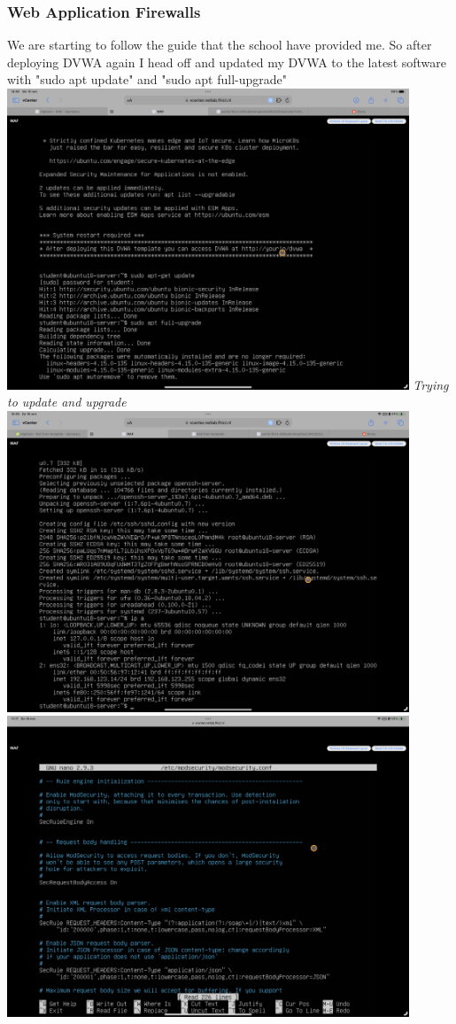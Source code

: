 \documentclass[12pt, letterpaper]{article}
\begin{document}
\subsubsection{Web Application Firewalls}
We are starting to follow the guide that the school have provided me. So after deploying DVWA again I head off and updated my DVWA to the latest software with "sudo apt update" and "sudo apt full-upgrade"
\hfill\break
\includegraphics[width=0.9\textwidth]{fotos/Week 3/WAF/Update.png}
\emph{Trying to update and upgrade}
\hfill\break
\hfill\break
\includegraphics[width=0.9\textwidth]{fotos/Week 3/WAF/Openssh install.png}
\break
\includegraphics[width=0.9\textwidth]{fotos/Week 3/WAF/Modsecurity config.png}
\end{document}
